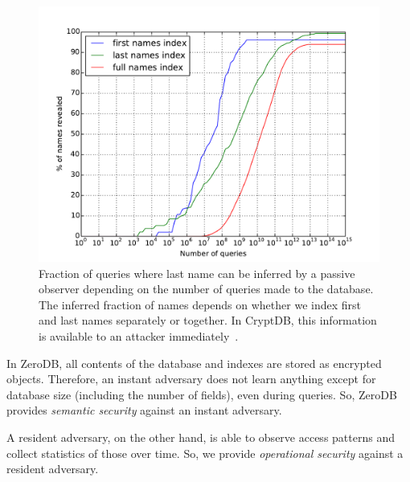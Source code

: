 \documentclass[notitlepage,longbibliography]{revtex4-1}
\begin{document}
\begin{figure}
	\begin{center}
        \includegraphics[width=0.7\columnwidth]{surname-attack.pdf}
	\end{center}
    \caption{
        Fraction of queries where last name can be inferred by a passive observer depending on the number of queries made to the database.
        The inferred fraction of names depends on whether we index first and last names separately or together.
        In CryptDB, this information is available to an attacker immediately~\cite{cryptdb}.
    }
	\label{fig:surname-attack}
\end{figure}

In ZeroDB, all contents of the database and indexes are stored as encrypted objects.
Therefore, an instant adversary does not learn anything except for database size (including the number of fields), even during queries.
So, ZeroDB provides \emph{semantic security} against an instant adversary.

A resident adversary, on the other hand, is able to observe access patterns and collect statistics of those over time.
So, we provide \emph{operational security} against a resident adversary.
\end{document}
